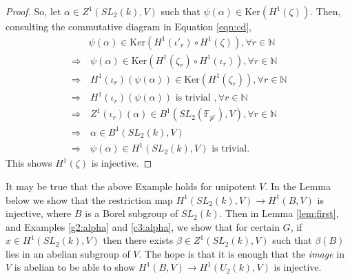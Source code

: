 \begin{proof}
So, let $\alpha \in Z^1(SL_2(k), V)$ such that $\psi(\alpha) \in \mathrm{Ker}\left(H^1(\zeta)\right)$.
Then, consulting the commutative diagram in Equation \ref{eqn:cd},
\begin{align*}
	&\psi(\alpha) \in \mathrm{Ker}\left(H^1(\iota'_r) \circ H^1(\zeta)\right), \forall r \in \mathbb{N} \\
	\Rightarrow &\,\psi(\alpha) \in \mathrm{Ker}\left(H^1(\zeta_r) \circ H^1(\iota_r)\right), \forall r \in \mathbb{N}  \\
	\Rightarrow &\,H^1(\iota_r)(\psi(\alpha)) \in \mathrm{Ker}\left(H^1(\zeta_r)\right), \forall r \in \mathbb{N}  \\
	\Rightarrow &\,H^1(\iota_r)(\psi(\alpha))\textrm{ is trivial }, \forall r \in \mathbb{N} \\%
	\Rightarrow &\,Z^1(\iota_r)(\alpha) \in B^1(SL_2(\mathbb{F}_{p^r}), V), \forall r \in \mathbb{N}  \\
	\Rightarrow &\,\alpha \in B^1(SL_2(k), V) \\ %
	\Rightarrow &\,\psi(\alpha) \in H^1(SL_2(k), V) \textrm{ is trivial}.
\end{align*}
This shows $H^1(\zeta)$ is injective.
\end{proof}

\begin{remark}
It may be true that the above Example holds for unipotent $V$. In the Lemma below we show that the restriction map $H^1(SL_2(k), V) \rightarrow  H^1(B, V)$ is injective, where $B$ is a Borel subgroup of $SL_2(k)$. Then in Lemma \ref{lem:first}, and Examples \ref{g2:alpha} and \ref{c3:alpha}, we show that for certain $G$, if $x\in H^1(SL_2(k), V)$ then there exists $\beta\in Z^1(SL_2(k), V)$ such that $\beta\left(B\right)$ lies in an abelian subgroup of $V$. The hope is that it is enough that the \emph{image} in $V$ is abelian to be able to show $H^1(B, V)\rightarrow H^1(U_2(k), V)$ is injective.
\end{remark}

